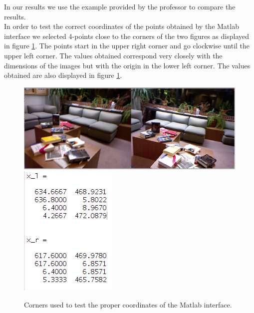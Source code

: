 \documentclass[a4paper,12pt]{article}
\begin{document}
    In our results we use the example provided by the professor to compare the results. \\

    In order to test the correct coordinates of the points obtained by the Matlab interface
    we selected 4-points close to the corners of the two figures as displayed in figure \ref{fig:check}. 
    The points start in the upper right corner and go clockwise until the upper left corner. 
    The values obtained correspond very closely with the dimensions of the images but with the
    origin in the lower left corner. The values obtained are also displayed in figure \ref{fig:check}.
    \begin{figure}[h]
        \centering
        \includegraphics[totalheight=.20\textheight]{./images/Test.jpg}
        \vspace{1px}
        \includegraphics[totalheight=.18\textheight]{./images/TestPts.png}
        \caption{Corners used to test the proper coordinates of the Matlab interface.}
        \label{fig:check}
    \end{figure}
\end{document}
